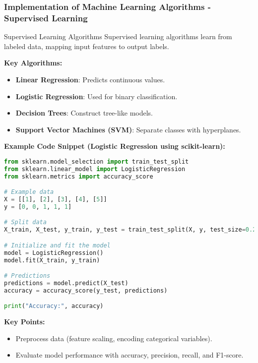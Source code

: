\documentclass[aspectratio=169]{beamer}
\begin{document}
\begin{frame}[fragile]
    \frametitle{Implementation of Machine Learning Algorithms - Supervised Learning}
    \begin{block}{Supervised Learning Algorithms}
        Supervised learning algorithms learn from labeled data, mapping input features to output labels.
    \end{block}
    
    \textbf{Key Algorithms:}
    \begin{itemize}
        \item \textbf{Linear Regression}: Predicts continuous values.
        \item \textbf{Logistic Regression}: Used for binary classification.
        \item \textbf{Decision Trees}: Construct tree-like models.
        \item \textbf{Support Vector Machines (SVM)}: Separate classes with hyperplanes.
    \end{itemize}
    
    \textbf{Example Code Snippet (Logistic Regression using scikit-learn):}
    \begin{lstlisting}[language=Python]
from sklearn.model_selection import train_test_split
from sklearn.linear_model import LogisticRegression
from sklearn.metrics import accuracy_score

# Example data
X = [[1], [2], [3], [4], [5]]
y = [0, 0, 1, 1, 1]

# Split data
X_train, X_test, y_train, y_test = train_test_split(X, y, test_size=0.2)

# Initialize and fit the model
model = LogisticRegression()
model.fit(X_train, y_train)

# Predictions
predictions = model.predict(X_test)
accuracy = accuracy_score(y_test, predictions)

print("Accuracy:", accuracy)
    \end{lstlisting}
    
    \textbf{Key Points:}
    \begin{itemize}
        \item Preprocess data (feature scaling, encoding categorical variables).
        \item Evaluate model performance with accuracy, precision, recall, and F1-score.
    \end{itemize}
\end{frame}
\end{document}
